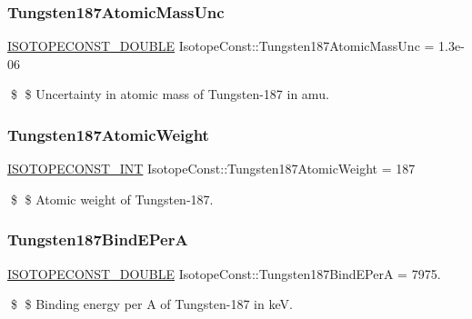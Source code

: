 \subsubsection{\texorpdfstring{Tungsten187\+Atomic\+Mass\+Unc}{Tungsten187AtomicMassUnc}}
{\footnotesize\ttfamily \mbox{\hyperlink{group___isotope_const-_macros_ga8f45a7272ce02c0b4c65c44636ed719a}{I\+S\+O\+T\+O\+P\+E\+C\+O\+N\+S\+T\+\_\+\+D\+O\+U\+B\+LE}} Isotope\+Const\+::\+Tungsten187\+Atomic\+Mass\+Unc = 1.\+3e-\/06}

\$ \$ Uncertainty in atomic mass of Tungsten-\/187 in amu. \mbox{\label{group___isotope_const-_tungsten-_w187_ga3c36768a2fe926f145694e9f62b0d267}} 
\subsubsection{\texorpdfstring{Tungsten187\+Atomic\+Weight}{Tungsten187AtomicWeight}}
{\footnotesize\ttfamily \mbox{\hyperlink{group___isotope_const-_macros_ga5f18360b3e99483a35c32d789e62621c}{I\+S\+O\+T\+O\+P\+E\+C\+O\+N\+S\+T\+\_\+\+I\+NT}} Isotope\+Const\+::\+Tungsten187\+Atomic\+Weight = 187}

\$ \$ Atomic weight of Tungsten-\/187. \mbox{\label{group___isotope_const-_tungsten-_w187_ga815ce1304b1e0d02713c25ef73ca1e57}} 
\subsubsection{\texorpdfstring{Tungsten187\+Bind\+E\+PerA}{Tungsten187BindEPerA}}
{\footnotesize\ttfamily \mbox{\hyperlink{group___isotope_const-_macros_ga8f45a7272ce02c0b4c65c44636ed719a}{I\+S\+O\+T\+O\+P\+E\+C\+O\+N\+S\+T\+\_\+\+D\+O\+U\+B\+LE}} Isotope\+Const\+::\+Tungsten187\+Bind\+E\+PerA = 7975.}

\$ \$ Binding energy per A of Tungsten-\/187 in keV. \mbox{\label{group___isotope_const-_tungsten-_w187_gaf45d0eb5878b064cc596cd799ff83d11}} 
